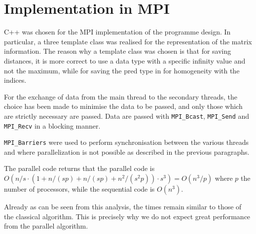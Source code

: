 \section{Implementation in MPI}\label{implementation-in-mpi}

C++ was chosen for the MPI implementation of the programme design. In particular, a three template class was realised for the representation of the matrix information. The reason why a template class was chosen is that for saving distances, it is more correct to use a data type with a specific infinity value and not the maximum, while for saving the pred type in for homogeneity with the indices.

For the exchange of data from the main thread to the secondary threads, the choice has been made to minimise the data to be passed, and only those which are strictly necessary are passed. Data are passed with \texttt{MPI\_Bcast}, \texttt{MPI\_Send} and \texttt{MPI\_Recv} in a blocking manner.

\texttt{MPI\_Barriers} were used to perform synchronisation between the various threads and where parallelization is not possible as described in the previous paragraphs.

The parallel code returns that the parallel code is \(O(n/s \cdot (1+n/(sp)+n/(sp)+n^2/(s^2p))\cdot s^3)=O(n^3/p)\) where \(p\) the number of processors, while the sequential code is \( O(n^3 ) \).

Already as can be seen from this analysis, the times remain similar to those of the classical algorithm.
This is precisely why we do not expect great performance from the parallel algorithm.

\FloatBarrier

